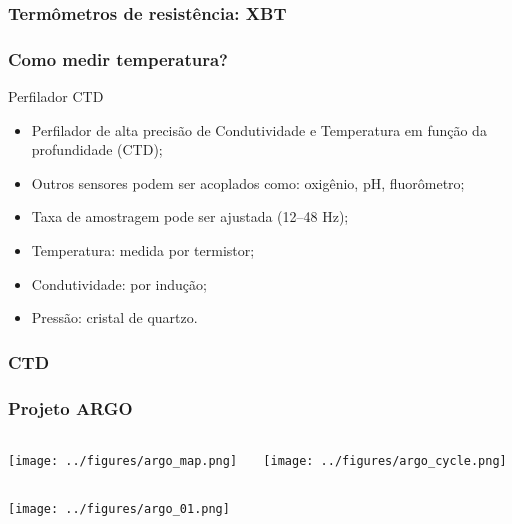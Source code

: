 \begin{frame}
\frametitle{Termômetros de resistência: XBT}
    \begin{center}
    \end{center}
\end{frame}

\begin{frame}
\frametitle{Como medir temperatura?}
    Perfilador CTD
    \small{
    \begin{itemize}[<+-| alert@+>]
    \item Perfilador de alta precisão de Condutividade e Temperatura em
          função da profundidade (CTD);
    \item Outros sensores podem ser acoplados como: oxigênio, pH, fluorômetro;
    \item Taxa de amostragem pode ser ajustada (12--48 Hz);
    \item Temperatura: medida por termistor;
    \item Condutividade: por indução;
    \item Pressão: cristal de quartzo.
    \end{itemize}
    }
\end{frame}

\begin{frame}
\frametitle{CTD}
    \begin{center}
    \end{center}
\end{frame}

\begin{frame}
\frametitle{Projeto ARGO}
    \begin{columns}
        \begin{column}{0.5\textwidth}
    \begin{center}
        \texttt{[image: ../figures/argo\_map.png]}
    \end{center}
        \end{column}
    \begin{column}{0.5\textwidth}
    \begin{center}
       \texttt{[image: ../figures/argo\_cycle.png]}
    \end{center}
    \end{column}
    \end{columns}
        \begin{center}
        \texttt{[image: ../figures/argo\_01.png]}    \end{center}
\end{frame}

